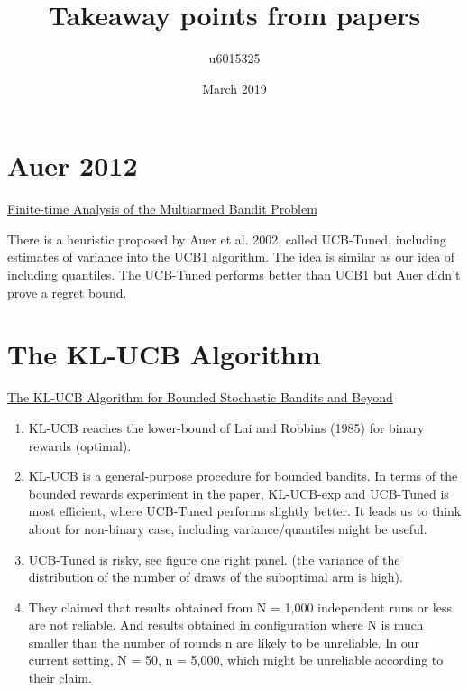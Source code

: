 \documentclass{article}
\title{Takeaway points from papers}
\author{u6015325 }
\date{March 2019}
\begin{document}
\maketitle

\section{Auer 2012}
\href{https://homes.di.unimi.it/~cesabian/Pubblicazioni/ml-02.pdf}{Finite-time Analysis of the Multiarmed Bandit Problem}

There is a heuristic proposed by Auer et al. 2002, called UCB-Tuned, including estimates of variance into the UCB1 algorithm. The idea is similar as our idea of including quantiles.
The UCB-Tuned performs better than UCB1 but Auer didn't prove a regret bound.
\section{The KL-UCB Algorithm }
\href{https://arxiv.org/abs/1102.2490}{The KL-UCB Algorithm for Bounded Stochastic Bandits and Beyond}
\begin{enumerate}
    \item KL-UCB reaches the lower-bound of Lai and Robbins (1985) for binary rewards (optimal).
    \item KL-UCB is a general-purpose procedure for bounded bandits. In terms of the bounded rewards experiment in the paper, KL-UCB-exp and UCB-Tuned is most efficient, where UCB-Tuned performs slightly better. It leads us to think about for non-binary case, including variance/quantiles might be useful.
    \item UCB-Tuned is risky, see figure one right panel. (the variance of the distribution of the number of draws of the suboptimal arm is high).
    \item They claimed that results obtained from N = 1,000 independent runs or less are not reliable. And results obtained in configuration where N is much smaller than the number of rounds n are likely to be unreliable. In our current setting, N = 50, n = 5,000, which might be unreliable according to their claim.
\end{enumerate}
\end{document}
